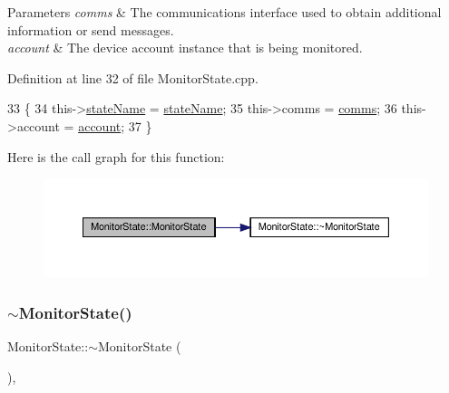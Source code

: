 \begin{DoxyParams}{Parameters}
{\em comms} & The communications interface used to obtain additional information or send messages. \\
\hline
{\em account} & The device account instance that is being monitored. \\
\hline
\end{DoxyParams}


Definition at line 32 of file Monitor\+State.\+cpp.


\begin{DoxyCode}
33 \{
34     this->\hyperlink{class_monitor_state_aaeef0ae307bb9cfcbb4fcb08c115fb0f}{stateName} = \hyperlink{class_monitor_state_aaeef0ae307bb9cfcbb4fcb08c115fb0f}{stateName};
35     this->comms = \hyperlink{class_monitor_state_a41914e9963c67ef2d17774f04bad3518}{comms};
36     this->account = \hyperlink{class_monitor_state_a41128d4942ec0d5b107c63d1d95af811}{account};
37 \}
\end{DoxyCode}
Here is the call graph for this function\+:
\nopagebreak
\begin{figure}[H]
\begin{center}
\leavevmode
\includegraphics[width=350pt]{dd/d45/class_monitor_state_ace027ab9e5703ac4e4b808eeebc3c961_cgraph}
\end{center}
\end{figure}
\mbox{\label{class_monitor_state_a8dc9d7a46aa3d0190ec65b0d56167d3e}} 
\subsubsection{\texorpdfstring{$\sim$\+Monitor\+State()}{~MonitorState()}}
{\footnotesize\ttfamily Monitor\+State\+::$\sim$\+Monitor\+State (\begin{DoxyParamCaption}{ }\end{DoxyParamCaption})\hspace{0.3cm}{\ttfamily [virtual]}, {\ttfamily [default]}}

